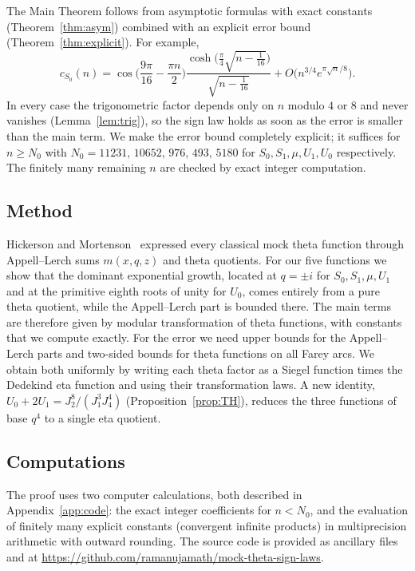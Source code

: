 \documentclass[11pt]{amsart}
\theoremstyle{definition}
\theoremstyle{remark}
\numberwithin{equation}{section}
\begin{document}
The Main Theorem follows from asymptotic formulas with exact constants (Theorem~\ref{thm:asym}) combined with an explicit error bound (Theorem~\ref{thm:explicit}).
For example,
\begin{equation}\label{eq:intro-asym}
c_{S_0}(n)=\cos\Big(\frac{9\pi}{16}-\frac{\pi n}{2}\Big)\frac{\cosh\big(\frac{\pi}{4}\sqrt{n-\frac1{16}}\big)}{\sqrt{n-\frac1{16}}}+O\big(n^{3/4}e^{\pi\sqrt n/8}\big).
\end{equation}
In every case the trigonometric factor depends only on $n$ modulo $4$ or $8$ and never vanishes (Lemma~\ref{lem:trig}), so the sign law holds as soon as the error is smaller than the main term.
We make the error bound completely explicit; it suffices for $n\ge N_0$ with $N_0=11231,\,10652,\,976,\,493,\,5180$ for $S_0,S_1,\mu,U_1,U_0$ respectively.
The finitely many remaining $n$ are checked by exact integer computation.

\subsection*{Method}
Hickerson and Mortenson~\cite{HM} expressed every classical mock theta function through Appell--Lerch sums $m(x,q,z)$ and theta quotients.
For our five functions we show that the dominant exponential growth, located at $q=\pm i$ for $S_0,S_1,\mu,U_1$ and at the primitive eighth roots of unity for $U_0$, comes entirely from a pure theta quotient, while the Appell--Lerch part is bounded there.
The main terms are therefore given by modular transformation of theta functions, with constants that we compute exactly.
For the error we need upper bounds for the Appell--Lerch parts and two-sided bounds for theta functions on all Farey arcs.
We obtain both uniformly by writing each theta factor as a Siegel function times the Dedekind eta function and using their transformation laws.
A new identity, $U_0+2U_1=J_2^8/(J_1^3J_4^4)$ (Proposition~\ref{prop:TH}), reduces the three functions of base $q^4$ to a single eta quotient.

\subsection*{Computations}
The proof uses two computer calculations, both described in Appendix~\ref{app:code}: the exact integer coefficients for $n<N_0$, and the evaluation of finitely many explicit constants (convergent infinite products) in multiprecision arithmetic with outward rounding.
The source code is provided as ancillary files and at \url{https://github.com/ramanujamath/mock-theta-sign-laws}.
\end{document}
